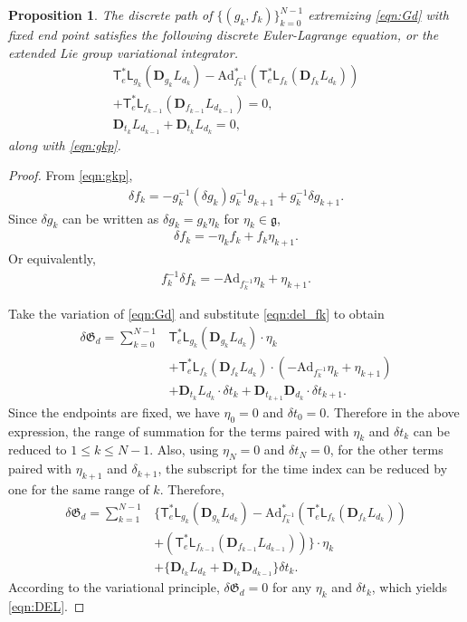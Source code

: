 \documentclass[letterpaper, 10pt, conference]{ieeeconf}
\newcommand{\T}{\ensuremath{\mathsf{T}}}
\renewcommand{\L}{\ensuremath{\mathsf{L}}}
\newcommand{\D}{\ensuremath{\mathbf{D}}}
\newcommand{\Ad}{\ensuremath{\mathrm{Ad}}}
\newcommand{\g}{\ensuremath{\mathfrak{g}}}
\newtheorem{prop}{Proposition}
\begin{document}
\begin{prop}
    The discrete path of $\{(g_k,f_k)\}_{k=0}^{N-1}$ extremizing \eqref{eqn:Gd} with fixed end point satisfies the following discrete Euler-Lagrange equation, or the extended Lie group variational integrator.
    \begin{gather}
        \T^*_e\L_{g_k}(\D_{g_k} L_{d_k})- \Ad^*_{f_k^{-1}} (\T^*_e\L_{f_k}(\D_{f_k} L_{d_k}))\nonumber \\
        + \T^*_e\L_{f_{k-1}}(\D_{f_{k-1}} L_{d_{k-1}}) =0,\label{eqn:DEL}\\
        \D_{t_k} L_{d_{k-1}} + \D_{t_k} L_{d_k} = 0, \label{eqn:DELt}
    \end{gather}
    along with \eqref{eqn:gkp}.
\end{prop}
\begin{proof}
    From \eqref{eqn:gkp},
    \begin{align*}
        \delta f_k = - g_k^{-1}( \delta g_k ) g_k^{-1} g_{k+1} + g_k^{-1}\delta g_{k+1}.
    \end{align*}
    Since $\delta g_k$ can be written as $\delta g_k = g_k \eta_k $ for $\eta_k\in \g$, 
    \begin{align*}
        \delta f_k = - \eta_k f_k +f_k \eta_{k+1}.
    \end{align*}
    Or equivalently, 
    \begin{align}
        f_k^{-1}\delta f_k = -\Ad_{f_k^{-1}} \eta_k + \eta_{k+1}.\label{eqn:del_fk}
    \end{align}

    Take the variation of \eqref{eqn:Gd} and substitute \eqref{eqn:del_fk} to obtain
    \begin{align*}
        \delta \mathfrak{G}_d  = \sum_{k=0}^{N-1}
        & \T^*_e\L_{g_k}(\D_{g_k} L_{d_k}) \cdot \eta_k \\
        & + \T^*_e\L_{f_k}(\D_{f_k} L_{d_k}) \cdot (-\Ad_{f_k^{-1}} \eta_k + \eta_{k+1}) \\
        & + \D_{t_k} L_{d_k}\cdot \delta t_k + \D_{t_{k+1}} \D_{d_k}\cdot \delta t_{k+1}.
    \end{align*}
    Since the endpoints are fixed, we have $\eta_0=0$ and $\delta t_0 = 0$.
    Therefore in the above expression, the range of summation for the terms paired with $\eta_k$ and $\delta t_k$ can be reduced to $1\leq k\leq N-1$. 
    Also, using $\eta_N=0$ and $\delta t_N=0$, for the other terms paired with $\eta_{k+1}$ and $\delta_{k+1}$, the subscript for the time index can be reduced by one for the same range of $k$.
    Therefore, 
    \begin{align*}
        \delta \mathfrak{G}_d  = \sum_{k=1}^{N-1}
        & \big\{ \T^*_e\L_{g_k}(\D_{g_k} L_{d_k})- \Ad^*_{f_k^{-1}} (\T^*_e\L_{f_k}(\D_{f_k} L_{d_k})) \\
        & + (\T^*_e\L_{f_{k-1}}(\D_{f_{k-1}} L_{d_{k-1}})) \big\} \cdot \eta_{k} \\
        & + \{ \D_{t_k} L_{d_k} + \D_{t_{k}} \D_{d_{k-1}} \} \delta t_k.
    \end{align*}
    According to the variational principle, $\delta\mathfrak{G}_d = 0$ for any $\eta_k$ and $\delta t_k$, which yields \eqref{eqn:DEL}.
\end{proof}
\end{document}
